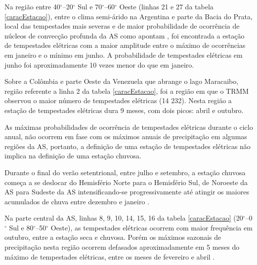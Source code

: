 

Na região entre 40$^{\circ}$--20$^{\circ}$ Sul e 70$^{\circ}$--60$^{\circ}$ Oeste (linhas 21 e 27 da tabela \ref{caracEstacao}),  entre o clima semi-árido na Argentina e parte da Bacia do Prata,  local das tempestades mais severas e de maior probabilidade de ocorrência de núcleos de convecção profunda da AS como apontam , foi encontrada a estação de tempestades elétricas com a maior amplitude entre o máximo de ocorrências em janeiro e o mínimo em junho. A probabilidade de tempestades elétricas em junho foi aproximadamente 10 vezes menor do que em janeiro.

Sobre a Colômbia e parte Oeste da Venezuela que abrange o lago Maracaibo, região referente a linha 2 da tabela \ref{caracEstacao}, foi a região em que o TRMM observou o maior número de tempestades elétricas ({14 232}). Nesta região a estação de tempestades elétricas dura  9 meses, com dois picos: abril e outubro.


As máximas probabilidades de ocorrência de tempestades elétricas durante o ciclo anual, não ocorrem em fase com os máximos anuais de precipitação em algumas regiões da AS, portanto, a definição de uma estação de tempestades elétricas não implica na definição de uma estação chuvosa. 

Durante o final do verão setentrional, entre julho e setembro, a estação chuvosa começa a se deslocar do Hemisfério Norte para o Hemisfério Sul, de Noroeste da AS para Sudeste da AS intensificando-se progressivamente até atingir os maiores acumulados de chuva entre dezembro e janeiro \cite{grimm2003nino,reboita2010regimes,Marengo2012,shi-atlas,bombardi2008variabilidade,cusdodioTese}.
 
Na parte central da AS, linhas  8, 9, 10, 14, 15, 16 da tabela \ref{caracEstacao} (20$^{\circ}$--0$^{\circ}$ Sul e 80$^{\circ}$--50$^{\circ}$ Oeste), as tempestades elétricas ocorrem com maior frequência em outubro, entre a estação seca e chuvosa. Porém os máximos sazonais de precipitação nesta região ocorrem defasados aproximadamente em 5 meses do máximo de tempestades elétricas, entre os meses de fevereiro e abril \cite{grimm2003nino,reboita2010regimes,shi-atlas,bombardi2008variabilidade,cusdodioTese}.

